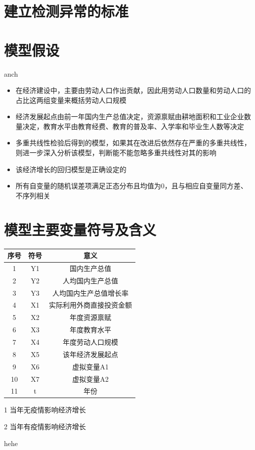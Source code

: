\documentclass[UTF8]{article}
\begin{document}
	\section{建立检测异常的标准}
	\subsection{}
	\section{模型假设}
		anch
	\begin{itemize}
		\item 在经济建设中，主要由劳动人口作出贡献，因此用劳动人口数量和劳动人口的占比这两组变量来概括劳动人口规模
		\item 经济发展起点由前一年国内生产总值决定，资源禀赋由耕地面积和工业企业数量决定，教育水平由教育经费、教育的普及率、入学率和毕业生人数等决定
		\item 多重共线性检验后得到的模型，如果其在改进后依然存在严重的多重共线性，则进一步深入分析该模型，判断能不能忽略多重共线性对其的影响
		\item 该经济增长的回归模型是正确设定的
		\item 所有自变量的随机误差项满足正态分布且均值为0，且与相应自变量同方差、不序列相关
	\end{itemize}
	\section{模型主要变量符号及含义}
		\begin{center}
			\begin{threeparttable}
				\setlength{\tabcolsep}{10mm}
				\begin{tabular}{ccc}
				\hline
				序号 & 符号 & 意义\\
				\hline
				1 & Y1 & 国内生产总值\\
				2 & Y2 & 人均国内生产总值\\
				3 & Y3 & 人均国内生产总值增长率\\
				4 & X1 & 实际利用外商直接投资金额\\
				5 & X2 & 年度资源禀赋\\
				6 & X3 & 年度教育水平\\
				7 & X4 & 年度劳动人口规模\\
				8 & X5 & 该年经济发展起点\\
				9 & X6 & 虚拟变量A1\tnote{1}\\
				10 & X7 & 虚拟变量A2\tnote{2}\\
				11 & t & 年份\\
				\hline
				\end{tabular}
				\begin{tablenotes}
					\item [1] 当年无疫情影响经济增长
					\item [2] 当年有疫情影响经济增长
				\end{tablenotes}
			\end{threeparttable}
		\end{center}
		hehe
\end{document}
